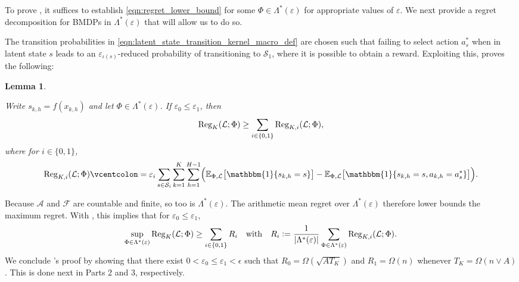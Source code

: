 \documentclass[11pt]{article}
\newcommand{\eqdef}{\vcentcolon=}
\newcommand{\mcA}{\mathcal{A}}
\newcommand{\mcF}{\mathcal{F}}
\newcommand{\mcL}{\mathcal{L}}
\newcommand{\mcS}{\mathcal{S}}
\newcommand{\mbbE}{\mathbb{E}}
\newcommand{\reg}{\textnormal{Reg}}
\newtheorem{lemma}[theorem]{Lemma}
\theoremstyle{definition}
\theoremstyle{definition}
\begin{document}
To prove , it suffices to establish \eqref{eqn:regret_lower_bound} for some $\Phi \in \Lambda^*( \varepsilon )$ for appropriate values of $\varepsilon$.
We next provide a regret decomposition for \glspl{BMDP} in $\Lambda^*( \varepsilon )$ that will allow us to do so.

The transition probabilities in \eqref{eqn:latent_state_transition_kernel_macro_def} are chosen such that failing to select action $a_s^*$ when in latent state $s$ leads to an $\varepsilon_{\iota(s)}$-reduced probability of transitioning to $\mcS_1$, where it is possible to obtain a reward.
Exploiting this,  proves the following:

\begin{lemma}
	\label{lem:regret_decomposition_lower_bound}

	Write $s_{k,h}=f(x_{k,h})$ and let $\Phi \in \Lambda^*( \varepsilon )$.
	If $\varepsilon_0 \leq \varepsilon_1$, then
	\begin{equation}
		\label{eqn:regret_decomposition_lower_bound}
		\reg_K(\mcL;\Phi)
		\geq
		\sum_{i \in \{0, 1 \}}
		\reg_{K,i}(\mcL;\Phi)
		,
	\end{equation}
	where for $i\in\{0,1\}$,
	\begin{equation}
		\reg_{K,i}(\mcL;\Phi)
		\eqdef
		\varepsilon_{i}
		\sum_{s\in\mcS_i}
		\sum_{k=1}^K
		\sum_{h=1}^{H-1}
		\Bigl(
		\mbbE_{\Phi,\mcL}
		\bigl[
			\mathbbm{1}\{s_{k,h}=s\}
			\bigr]
		-
		\mbbE_{\Phi,\mcL}
		\bigl[
			\mathbbm{1}\{s_{k,h}=s, a_{k,h}= a_s^*\}
			\bigr]
		\Bigr)
		.
	\end{equation}
\end{lemma}

Because $\mcA$ and $\mcF$ are countable and finite, so too is $\Lambda^*(\varepsilon)$.
The arithmetic mean regret over $\Lambda^*(\varepsilon)$ therefore lower bounds the maximum regret.
With , this implies that for $\varepsilon_0 \leq \varepsilon_1$,
\begin{equation}
	\label{eqn:bound_supremum_by_average}
	\sup_{\Phi \in \Lambda^*(\varepsilon)}
	\reg_K(\mcL;\Phi)
	\geq
	\sum_{i\in\{0,1\}}
	R_i
	\quad
	\mathrm{with}
	\quad
	R_i
	\eqdef
	\frac{1}{|\Lambda^*(\varepsilon)|}
	\sum_{\Phi \in \Lambda^*(\varepsilon)}
	\reg_{K,i}(\mcL;\Phi)
	.
\end{equation}
We conclude 's proof by showing that there exist $0<\varepsilon_0 \leq \varepsilon_1<\epsilon$ such that $R_0=\Omega(\sqrt{AT_K})$ and $R_1=\Omega(n)$ whenever $T_K=\Omega(n\vee A)$.
This is done next in Parts 2 and 3, respectively.
\end{document}
